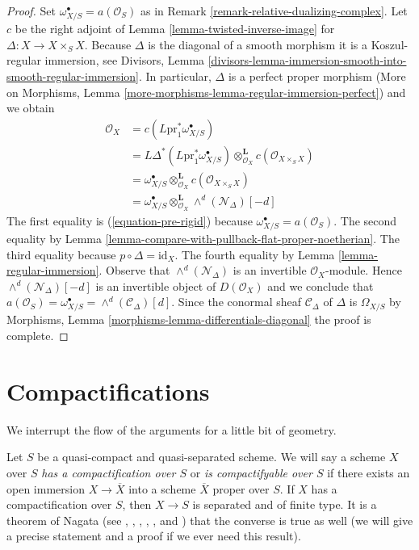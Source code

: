 \begin{proof}
Set $\omega_{X/S}^\bullet = a(\mathcal{O}_S)$ as in
Remark \ref{remark-relative-dualizing-complex}.
Let $c$ be the right adjoint of Lemma \ref{lemma-twisted-inverse-image} for
$\Delta : X \to X \times_S X$. Because $\Delta$
is the diagonal of a smooth morphism it is a
Koszul-regular immersion, see Divisors, Lemma
\ref{divisors-lemma-immersion-smooth-into-smooth-regular-immersion}.
In particular, $\Delta$ is a perfect proper morphism
(More on Morphisms, Lemma \ref{more-morphisms-lemma-regular-immersion-perfect})
and we obtain
\begin{align*}
\mathcal{O}_X
& =
c(L\text{pr}_1^*\omega_{X/S}^\bullet) \\
& =
L\Delta^*(L\text{pr}_1^*\omega_{X/S}^\bullet)
\otimes_{\mathcal{O}_X}^\mathbf{L}
c(\mathcal{O}_{X \times_S X}) \\
& =
\omega_{X/S}^\bullet \otimes_{\mathcal{O}_X}^\mathbf{L}
c(\mathcal{O}_{X \times_S X}) \\
& =
\omega_{X/S}^\bullet
\otimes_{\mathcal{O}_X}^\mathbf{L}
\wedge^d(\mathcal{N}_\Delta)[-d]
\end{align*}
The first equality is (\ref{equation-pre-rigid}) because
$\omega_{X/S}^\bullet = a(\mathcal{O}_S)$. The second equality by
Lemma \ref{lemma-compare-with-pullback-flat-proper-noetherian}.
The third equality because $p \circ \Delta = \text{id}_X$.
The fourth equality by Lemma \ref{lemma-regular-immersion}.
Observe that $\wedge^d(\mathcal{N}_\Delta)$ is an invertible
$\mathcal{O}_X$-module. Hence $\wedge^d(\mathcal{N}_\Delta)[-d]$
is an invertible object of $D(\mathcal{O}_X)$ and we conclude that
$a(\mathcal{O}_S) = \omega_{X/S}^\bullet = \wedge^d(\mathcal{C}_\Delta)[d]$.
Since the conormal sheaf $\mathcal{C}_\Delta$ of $\Delta$ is
$\Omega_{X/S}$ by
Morphisms, Lemma \ref{morphisms-lemma-differentials-diagonal}
the proof is complete.
\end{proof}









\section{Compactifications}
\label{section-compactify}

\noindent
We interrupt the flow of the arguments for a little bit of geometry.

\medskip\noindent
Let $S$ be a quasi-compact and quasi-separated scheme. We will say a
scheme $X$ over $S$ {\it has a compactification over $S$}
or {\it is compactifyable over $S$} if there exists
an open immersion $X \to \overline{X}$ into a scheme $\overline{X}$
proper over $S$. If $X$ has a compactification over $S$, then $X \to S$
is separated and of finite type. It is a theorem of Nagata (see
\cite{Lutkebohmert}, \cite{Conrad-Nagata}, \cite{Nagata-1},
\cite{Nagata-2}, \cite{Nagata-3}, and \cite{Nagata-4}) that the converse is
true as well (we will give a
precise statement and a proof if we ever need this result).

